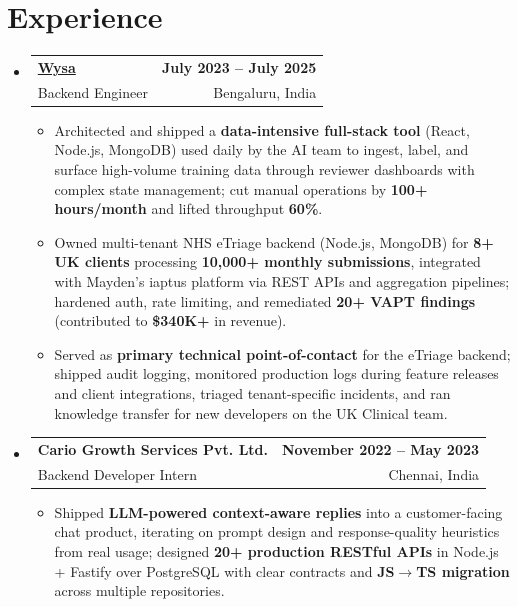 \documentclass[letterpaper,10pt]{article}
\makeatletter
\newcommand{\resumeItem}[1]{
  \item\small{#1\vspace{-1pt}}
}
\newcommand{\resumeSubheading}[4]{
  \vspace{1pt}\item
    \begin{tabular*}{0.985\textwidth}[t]{l@{\extracolsep{\fill}}r}
      \textbf{#1} & \textbf{\small #2} \\
      {\small\color{ResumeSlate} #3} & {\small\color{ResumeSlate} #4} \\
    \end{tabular*}\vspace{-6pt}
}
\newcommand{\resumeSubHeadingListStart}{\begin{itemize}[leftmargin=0.0in, label={}, itemsep=2pt, topsep=2pt]}
\newcommand{\resumeSubHeadingListEnd}{\end{itemize}}
\newcommand{\resumeItemListStart}{\begin{itemize}[leftmargin=0.18in, itemsep=2pt, topsep=1pt]}
\newcommand{\resumeItemListEnd}{\end{itemize}\vspace{-4pt}}
\makeatother
\begin{document}
\section{Experience}
\resumeSubHeadingListStart
  \resumeSubheading
    {\href{https://www.wysa.io}{Wysa}}{July 2023 -- July 2025}
    {Backend Engineer}{Bengaluru, India}
    \resumeItemListStart
      \resumeItem{Architected and shipped a \textbf{data-intensive full-stack tool} (React, Node.js, MongoDB) used daily by the AI team to ingest, label, and surface high-volume training data through reviewer dashboards with complex state management; cut manual operations by \textbf{100+ hours/month} and lifted throughput \textbf{60\%}.}
      \resumeItem{Owned multi-tenant NHS eTriage backend (Node.js, MongoDB) for \textbf{8+ UK clients} processing \textbf{10{,}000+ monthly submissions}, integrated with Mayden's iaptus platform via REST APIs and aggregation pipelines; hardened auth, rate limiting, and remediated \textbf{20+ VAPT findings} (contributed to \textbf{\$340K+} in revenue).}
      \resumeItem{Served as \textbf{primary technical point-of-contact} for the eTriage backend; shipped audit logging, monitored production logs during feature releases and client integrations, triaged tenant-specific incidents, and ran knowledge transfer for new developers on the UK Clinical team.}
    \resumeItemListEnd
  \resumeSubheading
    {Cario Growth Services Pvt. Ltd.}{November 2022 -- May 2023}
    {Backend Developer Intern}{Chennai, India}
    \resumeItemListStart
      \resumeItem{Shipped \textbf{LLM-powered context-aware replies} into a customer-facing chat product, iterating on prompt design and response-quality heuristics from real usage; designed \textbf{20+ production RESTful APIs} in Node.js + Fastify over PostgreSQL with clear contracts and \textbf{JS\(\rightarrow\)TS migration} across multiple repositories.}
    \resumeItemListEnd
\resumeSubHeadingListEnd
\vspace{-4pt}
\end{document}
